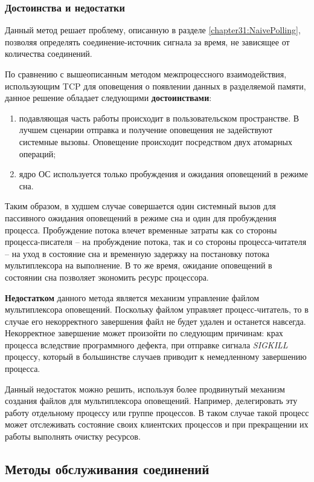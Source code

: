 \subsubsection{Достоинства и недостатки}

Данный метод решает проблему, описанную в разделе \ref{chapter31:NaivePolling}, позволяя определять соединение-источник сигнала за время, не зависящее от количества соединений.

По сравнению с вышеописанным методом межпроцессного взаимодействия, использующим TCP для оповещения о появлении данных в разделяемой памяти, данное решение обладает следующими \textbf{достоинствами}:
\begin{enumerate}
\item подавляющая часть работы происходит в пользовательском пространстве. В лучшем сценарии отправка и получение оповещения не задействуют системные вызовы. Оповещение происходит посредством двух атомарных операций;
\item ядро ОС используется только пробуждения и ожидания оповещений в режиме сна.
\end{enumerate}

Таким образом, в худшем случае совершается один системный вызов для пассивного ожидания оповещений в режиме сна и один для пробуждения процесса. Пробуждение потока влечет временные затраты как со стороны процесса-писателя -- на пробуждение потока, так и со стороны процесса-читателя -- на уход в состояние сна и временную задержку на постановку потока мультиплексора на выполнение. В то же время, ожидание оповещений в состоянии сна позволяет экономить ресурс процессора.

\textbf{Недостатком} данного метода является механизм управление файлом мультиплексора оповещений. Поскольку файлом управляет процесс-читатель, то в случае его некорректного завершения файл не будет удален и останется навсегда. Некорректное завершение может произойти по следующим причинам: крах процесса вследствие программного дефекта, при отправке сигнала \textit{SIGKILL} процессу, который в большинстве случаев приводит к немедленному завершению процесса.

Данный недостаток можно решить, используя более продвинутый механизм создания файлов для мультиплексора оповещений. Например, делегировать эту работу отдельному процессу или группе процессов. В таком случае такой процесс может отслеживать состояние своих клиентских процессов и при прекращении их работы выполнять очистку ресурсов.

\subsection{Методы обслуживания соединений}

